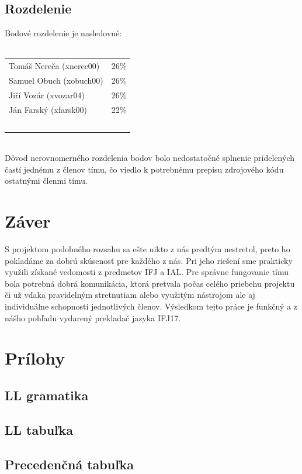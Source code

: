 \documentclass{article}
\begin{document}
        \subsection{Rozdelenie}
        \noindent
        Bodové rozdelenie je nasledovné:\\~\\
        \begin{tabular}{l l}
            Tomáš Nereča (xnerec00) & 26\% \\
            Samuel Obuch (xobuch00) & 26\% \\
            Jiří Vozár (xvozar04)   & 26\% \\
            Ján Farský (xfarsk00)   & 22\% \\~\\
        \end{tabular} \\
        Dôvod nerovnomerného rozdelenia bodov bolo nedostatočné splnenie pridelených častí jednému 
        z členov tímu, čo viedlo k potrebnému prepisu zdrojového kódu ostatnými členmi tímu.                                 

    \section{Záver}
    S projektom podobného rozsahu sa ešte nikto z nás predtým nestretol, preto ho pokladáme za dobrú
    skúsenosť pre každého z nás. Pri jeho riešení sme prakticky využili získané vedomosti z predmetov 
    IFJ a IAL. Pre správne fungovanie tímu bola potrebná dobrá komunikácia, ktorá pretvala počas celého
    priebehu projektu či už vďaka pravidelným stretnutiam alebo využitým nástrojom ale aj individuálne
    schopnosti jednotlivých členov. Výsledkom tejto práce je funkčný a z nášho pohľadu vydarený 
    prekladač jazyka IFJ17.
    
    \section{Prílohy}
        \subsection{LL gramatika}
        \subsection{LL tabuľka}
        \subsection{Precedenčná tabuľka}
\end{document}
